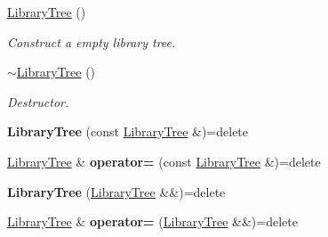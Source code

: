 \begin{DoxyCompactItemize}
\item 
\hyperlink{class_mdt_1_1_deploy_utils_1_1_library_tree_a5e2c5933e88786b6e67709c2887e15de}{Library\+Tree} ()
\begin{DoxyCompactList}\small\item\em Construct a empty library tree. \end{DoxyCompactList}\item 
\hyperlink{class_mdt_1_1_deploy_utils_1_1_library_tree_a6682b1ebd66c94223cd3b43f5c4878f3}{$\sim$\+Library\+Tree} ()
\begin{DoxyCompactList}\small\item\em Destructor. \end{DoxyCompactList}\item 
{\bfseries Library\+Tree} (const \hyperlink{class_mdt_1_1_deploy_utils_1_1_library_tree}{Library\+Tree} \&)=delete\hypertarget{class_mdt_1_1_deploy_utils_1_1_library_tree_ab7ba543cdaf20aad5df777428651b6e4}{}\label{class_mdt_1_1_deploy_utils_1_1_library_tree_ab7ba543cdaf20aad5df777428651b6e4}

\item 
\hyperlink{class_mdt_1_1_deploy_utils_1_1_library_tree}{Library\+Tree} \& {\bfseries operator=} (const \hyperlink{class_mdt_1_1_deploy_utils_1_1_library_tree}{Library\+Tree} \&)=delete\hypertarget{class_mdt_1_1_deploy_utils_1_1_library_tree_acfece4c061b7357f52174fa654d51528}{}\label{class_mdt_1_1_deploy_utils_1_1_library_tree_acfece4c061b7357f52174fa654d51528}

\item 
{\bfseries Library\+Tree} (\hyperlink{class_mdt_1_1_deploy_utils_1_1_library_tree}{Library\+Tree} \&\&)=delete\hypertarget{class_mdt_1_1_deploy_utils_1_1_library_tree_ac53e6f8b53200866351c9c93f2999a8f}{}\label{class_mdt_1_1_deploy_utils_1_1_library_tree_ac53e6f8b53200866351c9c93f2999a8f}

\item 
\hyperlink{class_mdt_1_1_deploy_utils_1_1_library_tree}{Library\+Tree} \& {\bfseries operator=} (\hyperlink{class_mdt_1_1_deploy_utils_1_1_library_tree}{Library\+Tree} \&\&)=delete\hypertarget{class_mdt_1_1_deploy_utils_1_1_library_tree_a85365ed8e477b71afd9a78654c7ecab4}{}\label{class_mdt_1_1_deploy_utils_1_1_library_tree_a85365ed8e477b71afd9a78654c7ecab4}


\end{DoxyCompactItemize}
